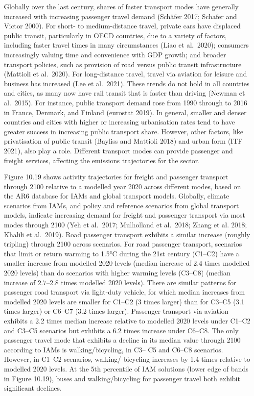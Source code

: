 \documentclass[
  letterpaper,
  DIV=11,
  numbers=noendperiod]{scrreprt}
\begin{document}
Globally over the last century, shares of faster transport modes have
generally increased with increasing passenger travel demand (Schäfer
2017; Schafer and Victor 2000). For short- to medium-distance travel,
private cars have displaced public transit, particularly in OECD
countries, due to a variety of factors, including faster travel times in
many circumstances (Liao et al.~2020); consumers increasingly valuing
time and convenience with GDP growth; and broader transport policies,
such as provision of road versus public transit infrastructure (Mattioli
et al.~2020). For long-distance travel, travel via aviation for leisure
and business has increased (Lee et al.~2021). These trends do not hold
in all countries and cities, as many now have rail transit that is
faster than driving (Newman et al.~2015). For instance, public transport
demand rose from 1990 through to 2016 in France, Denmark, and Finland
(eurostat 2019). In general, smaller and denser countries and cities
with higher or increasing urbanisation rates tend to have greater
success in increasing public transport share. However, other factors,
like privatisation of public transit (Bayliss and Mattioli 2018) and
urban form (ITF 2021), also play a role. Different transport modes can
provide passenger and freight services, affecting the emissions
trajectories for the sector.

Figure 10.19 shows activity trajectories for freight and passenger
transport through 2100 relative to a modelled year 2020 across different
modes, based on the AR6 database for IAMs and global transport models.
Globally, climate scenarios from IAMs, and policy and reference
scenarios from global transport models, indicate increasing demand for
freight and passenger transport via most modes through 2100 (Yeh et
al.~2017; Mulholland et al.~2018; Zhang et al. 2018; Khalili et
al.~2019). Road passenger transport exhibits a similar increase (roughly
tripling) through 2100 across scenarios. For road passenger transport,
scenarios that limit or return warming to 1.5°C during the 21st century
(C1--C2) have a smaller increase from modelled 2020 levels (median
increase of 2.4 times modelled 2020 levels) than do scenarios with
higher warming levels (C3--C8) (median increase of 2.7--2.8 times
modelled 2020 levels). There are similar patterns for passenger road
transport via light-duty vehicle, for which median increases from
modelled 2020 levels are smaller for C1--C2 (3 times larger) than for
C3--C5 (3.1 times larger) or C6--C7 (3.2 times larger). Passenger
transport via aviation exhibits a 2.2 times median increase relative to
modelled 2020 levels under C1--C2 and C3--C5 scenarios but exhibits a
6.2 times increase under C6--C8. The only passenger travel mode that
exhibits a decline in its median value through 2100 according to IAMs is
walking/bicycling, in C3-- C5 and C6--C8 scenarios. However, in C1--C2
scenarios, walking/ bicycling increases by 1.4 times relative to
modelled 2020 levels. At the 5th percentile of IAM solutions (lower edge
of bands in Figure 10.19), buses and walking/bicycling for passenger
travel both exhibit significant declines.
\end{document}
